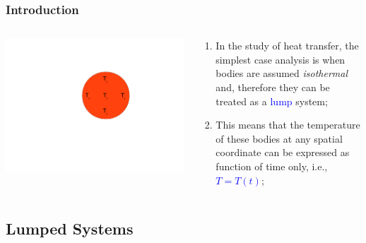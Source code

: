 \documentclass[10pt,compress]{beamer}
\newcommand{\blue}{\textcolor{blue}}
\begin{document}
\begin{frame}
 \frametitle{Introduction}
   \begin{columns}
     \begin{column}[l]{0.5\linewidth}
        \begin{center}
          \includegraphics[width=\columnwidth,clip]{./Pics/Lumped1}
        \end{center}
     \end{column}
%
     \begin{column}[l]{0.5\linewidth}
        \begin{enumerate}
           \item<1-> In the study of heat transfer, the simplest case analysis is when bodies are assumed {\it isothermal} and, therefore they can be treated as a \blue{lump} system;
           \item<1-> This means that the temperature of these bodies at any spatial coordinate can be expressed as function of time only, i.e., \blue{$T=T\left(t\right)$};
        \end{enumerate}
     \end{column}     
   \end{columns}
\end{frame}

\subsection{Lumped Systems}
\end{document}

